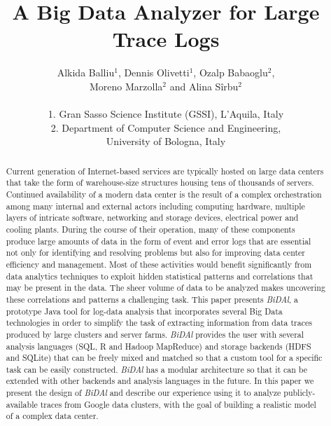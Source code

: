 \documentclass{article}
\begin{document}
\title{A Big Data Analyzer for Large Trace Logs}




\author{Alkida Balliu$^1$, Dennis Olivetti$^1$, Ozalp Babaoglu$^2$,\\
        Moreno Marzolla$^2$ and Alina S\^irbu$^2$\\
        \\
        1. Gran Sasso Science Institute (GSSI), L'Aquila, Italy\\
	2. Department of Computer Science and Engineering, \\University of Bologna, Italy
}



      
         
\date{}


\maketitle

\begin{abstract}
Current generation of Internet-based services are typically hosted on large data centers that take the form of warehouse-size structures housing tens of thousands of servers. Continued availability of a modern data center is the result of a complex orchestration among many internal and external actors including computing hardware, multiple layers of intricate software, networking and storage devices, electrical power and cooling plants.  During the course of their operation, many of these components produce large amounts of data in the form of event and error logs that are essential not only for identifying and resolving problems but also for improving data center efficiency and management. Most of these activities would benefit significantly from data analytics techniques to exploit hidden statistical patterns and correlations that may be present in the data. The sheer volume of data to be analyzed makes uncovering these correlations and patterns a challenging task. This paper presents \emph{BiDAl}, a prototype Java tool for log-data analysis that incorporates several Big Data technologies in order to simplify the task of extracting information from data traces produced by large clusters and server farms. \emph{BiDAl} provides the user with several analysis languages (SQL, R and Hadoop MapReduce) and storage backends (HDFS and SQLite) that can be freely mixed and matched so that a custom tool for a specific task can be easily constructed. \emph{BiDAl} has a modular architecture so that it can be extended with other backends and analysis languages in the future. In this paper we present the design of \emph{BiDAl} and describe our experience using it to analyze publicly-available traces from Google data clusters, with the goal of building a realistic model of a complex data center.
\end{abstract}
\end{document}
